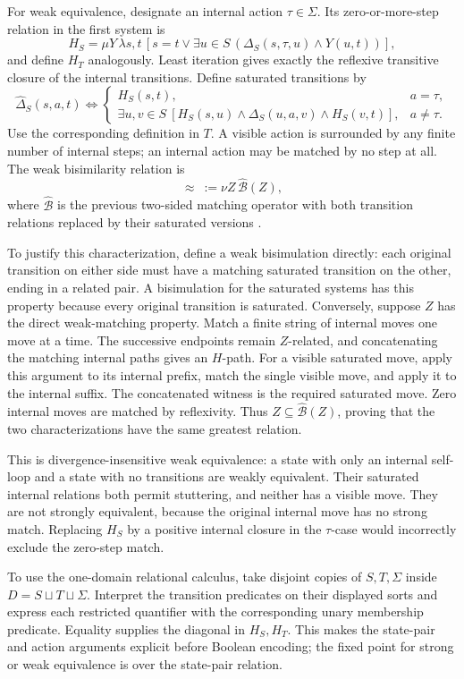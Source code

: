 For weak equivalence, designate an internal action \(\tau\in\Sigma\).
Its zero-or-more-step relation in the first system is
\[
 H_S=\mu Y\,\lambda s,t\,
      [s=t\lor\exists u\in S\,
          (\Delta_S(s,\tau,u)\land Y(u,t))],
\]
and define \(H_T\) analogously. Least iteration gives exactly the
reflexive transitive closure of the internal transitions.
Define saturated transitions by
\[
 \widehat\Delta_S(s,a,t)\iff
 \begin{cases}
  H_S(s,t),&a=\tau,\\
  \exists u,v\in S\
   [H_S(s,u)\land\Delta_S(u,a,v)\land H_S(v,t)],&a\ne\tau.
 \end{cases}
\]
Use the corresponding definition in \(T\). A visible action is
surrounded by any finite number of internal steps; an internal
action may be matched by no step at all.
The weak bisimilarity relation is
\[
 {\approx}\ :=\nu Z\,\widehat{\mathcal B}(Z),
\]
where \(\widehat{\mathcal B}\) is the previous two-sided matching
operator with both transition relations replaced by their saturated
versions \cite[\S8.2]{BurchEtAl1992}.

To justify this characterization, define a weak bisimulation directly:
each original transition on either side must have a matching saturated
transition on the other, ending in a related pair. A bisimulation for
the saturated systems has this property because every original
transition is saturated. Conversely, suppose \(Z\) has the direct
weak-matching property. Match a finite string of internal moves
one move at a time. The successive endpoints remain \(Z\)-related,
and concatenating the matching internal paths gives an \(H\)-path.
For a visible saturated move, apply this argument to its internal
prefix, match the single visible move, and apply it to the internal
suffix. The concatenated witness is the required saturated move.
Zero internal moves are matched by reflexivity. Thus
\(Z\subseteq\widehat{\mathcal B}(Z)\), proving that the two
characterizations have the same greatest relation.

This is divergence-insensitive weak equivalence: a state with only an
internal self-loop and a state with no transitions are weakly
equivalent. Their saturated internal relations both permit stuttering,
and neither has a visible move. They are not strongly equivalent,
because the original internal move has no strong match.
Replacing \(H_S\) by a positive internal closure in the \(\tau\)-case
would incorrectly exclude the zero-step match.

To use the one-domain relational calculus, take disjoint copies of
\(S,T,\Sigma\) inside \(D=S\sqcup T\sqcup\Sigma\). Interpret the
transition predicates on their displayed sorts and express each
restricted quantifier with the corresponding unary membership
predicate. Equality supplies the diagonal in \(H_S,H_T\).
This makes the state-pair and action arguments explicit before
Boolean encoding; the fixed point for strong or weak equivalence
is over the state-pair relation.

